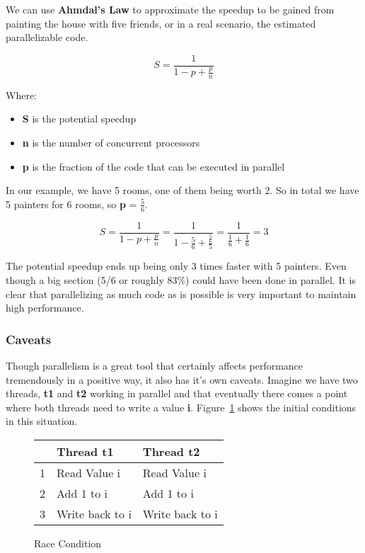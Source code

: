 \documentclass[letterpaper, 12pt]{article}
\begin{document}
We can use {\bfseries Ahmdal's Law} to approximate the speedup to be gained from painting the house with five friends, or in a real scenario, the estimated parallelizable code.

\begin{equation}
	S = \frac{1}{1-p+\frac{p}{n}}
\end{equation}

Where:

\begin{itemize}
	\item {\bfseries S} is the potential speedup
	\item {\bfseries n} is the number of concurrent processors
	\item {\bfseries p} is the fraction of the code that can be executed in parallel
\end{itemize}

In our example, we have 5 rooms, one of them being worth 2. So in total we have 5 painters for 6 rooms, so
{\bfseries p} = \(\frac{5}{6}\).


\begin{equation}
	S = \frac{1}{1-p+\frac{p}{n}} = \frac{1}{1-\frac{5}{6}+\frac{\frac{5}{6}}{5}} = \frac{1}{\frac{1}{6}+\frac{1}{6}} = 3
\end{equation}

The potential speedup ends up being only 3 times faster with 5 painters. Even though a big section
(5/6 or roughly 83\%) could have been done in parallel. It is clear that parallelizing as much
code as is possible is very important to maintain high performance.

\subsubsection{Caveats}

Though parallelism is a great tool that certainly affects performance tremendously in a positive way,
it also has it's own caveats. Imagine we have two threads, {\bfseries t1} and {\bfseries t2}
working in parallel and that eventually there comes a point where both threads need to write a value {\bfseries i}.
Figure~\ref{fig:race_cond_1} shows the initial conditions in this situation.
\par\vspace{\baselineskip}

\begin{figure}[H]
\centering
\begin{tabular}{|l|l|l|}
	\hline
	& {\bfseries Thread t1} & {\bfseries Thread t2} \\
	\hline
	1 & Read Value i & Read Value i \\
	\hline
	2 & Add 1 to i & Add 1 to i \\
	\hline
	3 & Write back to i & Write back to i \\
	\hline
\end{tabular}
\caption{Race Condition}
\label{fig:race_cond_1}
\end{figure}
\end{document}
